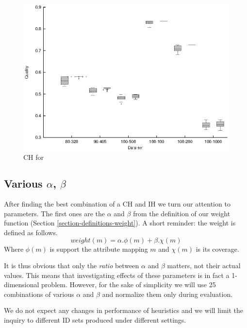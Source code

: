\begin{figure}
  \caption{CH for }
  \label{image-experiment-ch-for-mutation}
  \centering
    \includegraphics[width=\textwidth]{images/experiments/ch-for-mutation}
\end{figure}

\subsection{\texorpdfstring{Various $\alpha$, $\beta$}{Various alpha, beta}}

After finding the best combination of a CH and IH we turn our attention to parameters. The first ones are the $\alpha$ and $\beta$ from the definition of our weight function (Section \ref{section-definitions-weight}). A short reminder: the weight is defined as follows. 
\[weight(m) = \alpha . \phi(m) + \beta . \chi(m)\]
Where $\phi(m)$ is support the attribute mapping $m$ and $\chi(m)$ is its coverage.

It is thus obvious that only the \textit{ratio} between $\alpha$ and $\beta$ matters, not their actual values. This means that investigating effects of these parameters is in fact a 1-dimensional problem. However, for the sake of simplicity we will use 25 combinations of various $\alpha$ and $\beta$ and normalize them only during evaluation.

We do not expect any changes in performance of heuristics and we will limit the inquiry to different ID sets produced under different settings.

